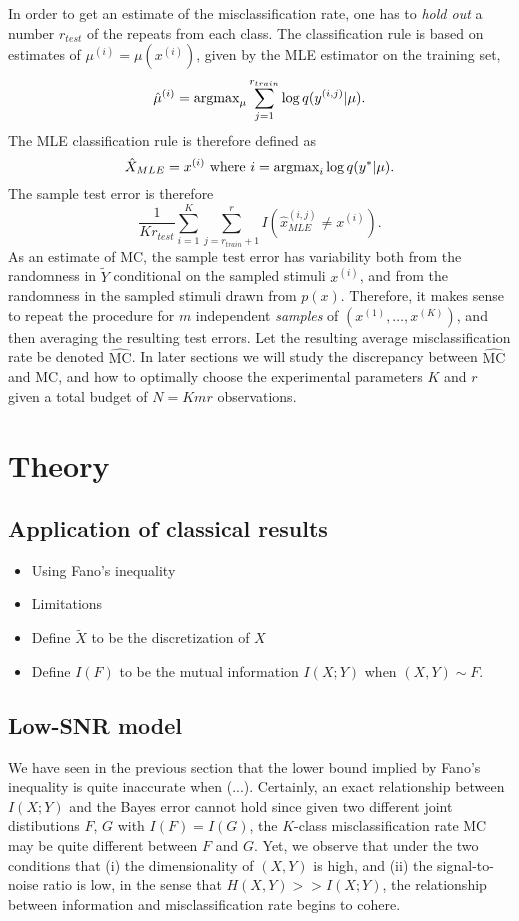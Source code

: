 \documentclass[12pt]{article}
\begin{document}
In order to get an estimate of the misclassification rate, one
has to \emph{hold out} a number $r_{test}$ of the repeats from each class.
The classification rule is based on estimates of $\mu^{(i)}
= \mu(x^{(i)})$, given by the MLE estimator on the training set,
\[
\hat{\mu}^{(i)} = \text{argmax}_\mu \sum_{j=1}^{r_{train}} \log q(y^{(i, j)}|\mu).
\]
The MLE classification rule is therefore defined as
\[
\hat{X}_{MLE} = x^{(i)} \text{ where }i = \text{argmax}_i  \log q(y^*|\mu).
\]
The sample test error is therefore
\[
\frac{1}{K r_{test}} \sum_{i=1}^K \sum_{j=r_{train}+1}^r I(\hat{x}_{MLE}^{(i,j)} \neq x^{(i)}).
\] 
As an estimate of $\text{MC}$, the sample test error has variability
both from the randomness in $\tilde{Y}$ conditional on the sampled
stimuli $x^{(i)}$, and from the randomness in the sampled stimuli
drawn from $p(x)$.  Therefore, it makes sense to repeat the procedure
for $m$ independent \emph{samples} of $(x^{(1)},\hdots, x^{(K)})$, and
then averaging the resulting test errors.  Let the resulting average
misclassification rate be denoted $\hat{\text{MC}}$.  In later
sections we will study the discrepancy between $\hat{\text{MC}}$ and
$\text{MC}$, and how to optimally choose the experimental parameters
$K$ and $r$ given a total budget of $N = Kmr$ observations.



\section{Theory}

\subsection{Application of classical results}

\begin{itemize}
\item Using Fano's inequality
\item Limitations
\item Define $\tilde{X}$ to be the discretization of $X$
\item Define $I(F)$ to be the mutual information $I(X;Y)$ when $(X, Y) \sim F$.
\end{itemize}

\subsection{Low-SNR model}

We have seen in the previous section that the lower bound implied by
Fano's inequality is quite inaccurate when (...).  Certainly, an exact
relationship between $I(X;Y)$ and the Bayes error cannot hold since
given two different joint distibutions $F$, $G$ with $I(F) = I(G)$,
the $K$-class misclassification rate $\text{MC}$ may be quite
different between $F$ and $G$.  Yet, we observe that under the two
conditions that (i) the dimensionality of $(X,Y)$ is high, and (ii)
the signal-to-noise ratio is low, in the sense that $H(X, Y) >>
I(X;Y)$, the relationship between information and misclassification
rate begins to cohere.
\end{document}
